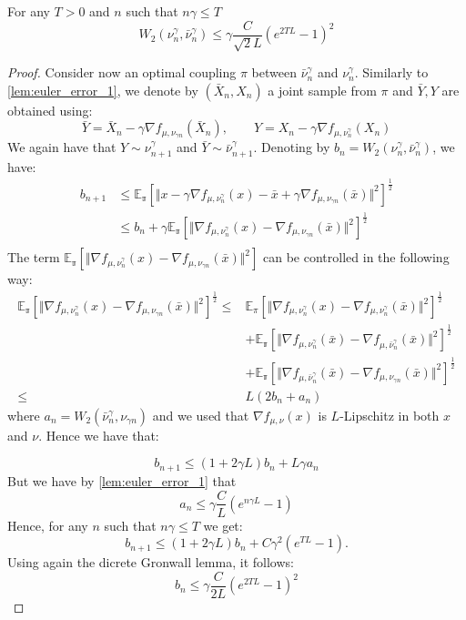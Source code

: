 \begin{lemma}\label{lem:euler_error_2}
For any $T>0$ and $n$ such that $n\gamma\leq T$
\[
W_{2}(\nu_{n}^{\gamma},\bar{\nu}_{n}^{\gamma})\leq\gamma\frac{C}{\sqrt{2}L}(e^{2TL}-1)^{2}
\]
\end{lemma}
%
\begin{proof}
Consider now an optimal coupling $\pi$ between $\bar{\nu}_{n}^{\gamma}$
and $\nu_{n}^{\gamma}$. Similarly to \ref{lem:euler_error_1}, we
denote by $(\bar{X}_{n},X_{n})$ a joint sample from $\pi$ and $\bar{Y},Y$
are obtained using:
\[
\bar{Y}=\bar{X}_{n}-\gamma\nabla f_{\mu,\nu_{\gamma n}}(\bar{X}_{n}),\qquad Y=X_{n}-\gamma\nabla f_{\mu,\nu_{n}^{\gamma}}(X_{n})
\]
We again have that $Y\sim\nu_{n+1}^{\gamma}$ and $\bar{Y}\sim\bar{\nu}_{n+1}^{\gamma}$.
Denoting by $b_{n}=W_{2}(\nu_{n}^{\gamma},\bar{\nu}_{n}^{\gamma})$,
we have:
\begin{align*}
b_{n+1} & \leq\mathbb{E_{\pi}}\left[\Vert x-\gamma\nabla f_{\mu,\nu_{n}^{\gamma}}(x)-\bar{x}+\gamma\nabla f_{\mu,\nu_{\gamma n}}(\bar{x})\Vert^{2}\right]^{\frac{1}{2}}\\
 & \leq b_{n}+\gamma\mathbb{E_{\pi}}\left[\Vert\nabla f_{\mu,\nu_{n}^{\gamma}}(x)-\nabla f_{\mu,\nu_{\gamma n}}(\bar{x})\Vert^{2}\right]^{\frac{1}{2}}\\
\end{align*}
The term $\mathbb{E_{\pi}}\left[\Vert\nabla f_{\mu,\nu_{n}^{\gamma}}(x)-\nabla f_{\mu,\nu_{\gamma n}}(\bar{x})\Vert^{2}\right]$
can be controlled in the following way:
\begin{align*}
\mathbb{E_{\pi}}\left[\Vert\nabla f_{\mu,\nu_{n}^{\gamma}}(x)-\nabla f_{\mu,\nu_{\gamma n}}(\bar{x})\Vert^{2}\right]^{\frac{1}{2}}  \leq & \mathbb{E}_{\pi}\left[\Vert\nabla f_{\mu,\nu_{n}^{\gamma}}(x)-\nabla f_{\mu,\nu_{n}^{\gamma}}(\bar{x})\Vert^{2}\right]^{\frac{1}{2}}\\
	&+\mathbb{E_{\pi}}\left[\Vert\nabla f_{\mu,\nu_{n}^{\gamma}}(\bar{x})-\nabla f_{\mu,\bar{\nu}_{n}^{\gamma}}(\bar{x})\Vert^{2}\right]^{\frac{1}{2}}\\
	&+ \mathbb{E_{\pi}}\left[\Vert\nabla f_{\mu,\bar{\nu}_{n}^{\gamma}}(\bar{x})-\nabla f_{\mu,\nu_{\gamma n}}(\bar{x})\Vert^{2}\right]^{\frac{1}{2}}\\
  \leq & L(2b_{n}+a_{n})
\end{align*}
where $a_{n}=W_{2}(\bar{\nu}_{n}^{\gamma},\nu_{\gamma n})$ and we
used that $\nabla f_{\mu,\nu}(x)$ is $L$-Lipschitz in both $x$
and $\nu$. Hence we have that:

\[
b_{n+1}\leq(1+2\gamma L)b_{n}+L\gamma a_{n}
\]
But we have by \ref{lem:euler_error_1} that 
\[
a_{n}\leq\gamma\frac{C}{L}(e^{n\gamma L}-1)
\]
Hence, for any $n$ such that $n\gamma\leq T$ we get:
\[
b_{n+1}\leq(1+2\gamma L)b_{n}+C\gamma^{2}(e^{TL}-1).
\]
Using again the dicrete Gronwall lemma, it follows:
\[
b_{n}\leq\gamma\frac{C}{2L}(e^{2TL}-1)^{2}
\]
\end{proof}
%

